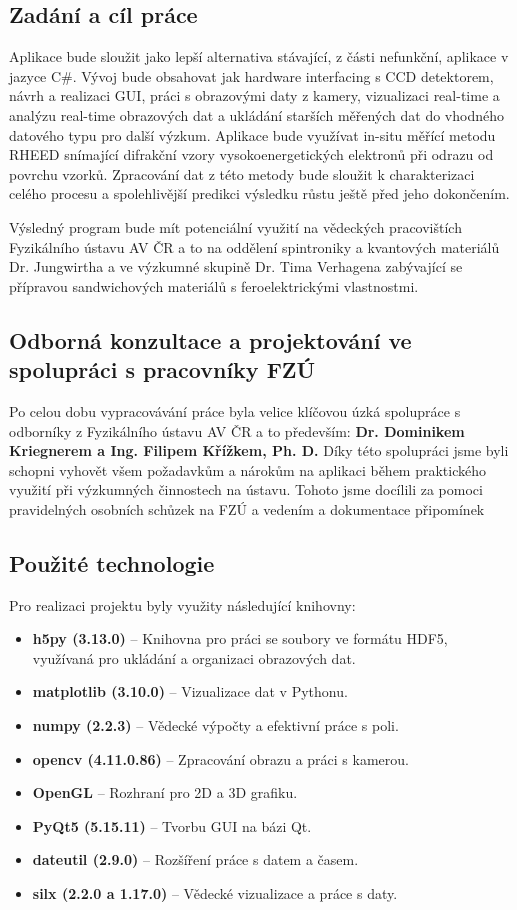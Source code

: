 \documentclass[a4paper,11pt]{article}
\begin{document}
\subsection{Zadání a cíl práce}
    Aplikace bude sloužit jako lepší alternativa stávající, z části nefunkční, aplikace v jazyce C\#. Vývoj bude obsahovat jak hardware interfacing s CCD detektorem, návrh a realizaci GUI, práci s obrazovými daty z kamery, vizualizaci real-time a analýzu real-time obrazových dat a ukládání starších měřených dat do vhodného datového typu pro další výzkum. Aplikace bude využívat in-situ měřící metodu RHEED snímající difrakční vzory vysokoenergetických elektronů při odrazu od povrchu vzorků. Zpracování dat z této metody bude sloužit k charakterizaci celého procesu a spolehlivější predikci výsledku růstu ještě před jeho dokončením. 
    
    Výsledný program bude mít potenciální využití na vědeckých pracovištích Fyzikálního ústavu AV ČR a to na oddělení spintroniky a kvantových materiálů Dr. Jungwirtha a ve výzkumné skupině Dr. Tima Verhagena zabývající se přípravou sandwichových materiálů s feroelektrickými vlastnostmi.
    
\subsection{Odborná konzultace a projektování ve spolupráci s pracovníky FZÚ}
	Po celou dobu vypracovávání práce byla velice klíčovou úzká spolupráce s odborníky z Fyzikálního ústavu AV ČR a to především: \textbf{Dr. Dominikem Kriegnerem a Ing. Filipem Křížkem, Ph. D.} Díky této spolupráci jsme byli schopni vyhovět všem požadavkům a nárokům na aplikaci během praktického využití při výzkumných činnostech na ústavu. Tohoto jsme docílili za pomoci pravidelných osobních schůzek na FZÚ a vedením a dokumentace připomínek
	
	
\newpage
\subsection{Použité technologie}

Pro realizaci projektu byly využity následující knihovny:

\begin{itemize}
    \item \textbf{h5py (3.13.0)} – Knihovna pro práci se soubory ve formátu HDF5, využívaná pro ukládání a organizaci obrazových dat. 
    \item \textbf{matplotlib (3.10.0)} – Vizualizace dat v Pythonu.
    \item \textbf{numpy (2.2.3)} – Vědecké výpočty a efektivní práce s poli.
    \item \textbf{opencv (4.11.0.86)} – Zpracování obrazu a práci s kamerou.
    \item \textbf{OpenGL} – Rozhraní pro 2D a 3D grafiku.
    \item \textbf{PyQt5 (5.15.11)} – Tvorbu GUI na bázi Qt.
    \item \textbf{dateutil (2.9.0)} – Rozšíření práce s datem a časem.
    \item \textbf{silx (2.2.0 a 1.17.0)} – Vědecké vizualizace a práce s daty.
\end{itemize}
\end{document}
